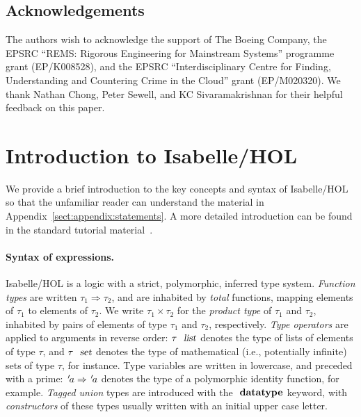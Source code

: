 \documentclass[11pt]{article}
\begin{document}
\subsection*{Acknowledgements}

The authors wish to acknowledge the support of The Boeing Company,
the EPSRC ``REMS: Rigorous Engineering for Mainstream Systems'' programme grant (EP/K008528), and
the EPSRC ``Interdisciplinary Centre for Finding, Understanding and Countering Crime in the Cloud'' grant (EP/M020320).
We thank Nathan Chong, Peter Sewell, and KC Sivaramakrishnan for their helpful feedback on this paper.

\newpage


{}

\newpage

\appendix

\section{Introduction to Isabelle/HOL}
\label{sect:appendix:isabelle}

We provide a brief introduction to the key concepts and syntax of Isabelle/HOL so that the unfamiliar reader can understand the material in Appendix~\ref{sect:appendix:statements}.
A more detailed introduction can be found in the standard tutorial material~\cite{DBLP:books/sp/NipkowK14}.

\paragraph{Syntax of expressions.}

Isabelle/HOL is a logic with a strict, polymorphic, inferred type system.
\emph{Function types} are written $\tau_1 \Rightarrow \tau_2$, and are inhabited by \emph{total} functions, mapping elements of $\tau_1$ to elements of $\tau_2$.
We write $\tau_1 \times \tau_2$ for the \emph{product type} of $\tau_1$ and $\tau_2$, inhabited by pairs of elements of type $\tau_1$ and $\tau_2$, respectively.
\emph{Type operators} are applied to arguments in reverse order: $\tau\ \isa{list}$ denotes the type of lists of elements of type $\tau$, and $\tau\ \isa{set}$ denotes the type of mathematical (i.e., potentially infinite) sets of type $\tau$, for instance.
Type variables are written in lowercase, and preceded with a prime: ${\emph{$\mskip2mu{'}\mskip-2mu$}}a \Rightarrow {\emph{$\mskip2mu{'}\mskip-2mu$}}a$ denotes the type of a polymorphic identity function, for example.
\emph{Tagged union} types are introduced with the $\isacommand{datatype}$ keyword, with \emph{constructors} of these types usually written with an initial upper case letter.
\end{document}
